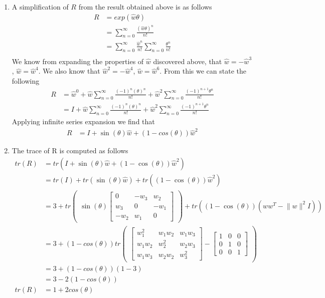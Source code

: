 \documentclass[10pt]{article}
\def\0{\boldsymbol{0}}
\def\w{\boldsymbol{w}}
\begin{document}
\begin{enumerate}
\begin{enumerate}
\item A simplification of $R$ from the result obtained above is as follows
\begin {align*} R &= exp(\hat{w} \theta) \\
&= \sum_{n=0}^{\infty} \frac{(\hat{w}\theta)^n}{n!} \\
&= \sum_{n=0}^{\infty} \frac{\hat{w}^n}{n!} \sum_{n=0}^{\infty} \frac{\theta^n}{n!} \\
\end{align*}
We know from expanding the properties of $\hat{w}$ discovered above, that $\hat{w} = - \hat{w}^3$, $\hat{w} = \hat{w}^4$. We also know that $\hat{w}^2 = - \hat{w}^4$, $\hat{w} = \hat{w}^6$. From this we can state the following
\begin{align*} R &= \hat{w}^0 + \hat{w} \sum_{n=0}^{\infty} \frac{(-1)^{n}(\theta)^n}{n!} + \hat{w}^2 \sum_{n=0}^{\infty} \frac{(-1)^{n+1}\theta^n}{n!} \\
&= I+ \hat{w} \sum_{n=0}^{\infty} \frac{(-1)^{n}(\theta)^n}{n!} + \hat{w}^2 \sum_{n=0}^{\infty} \frac{(-1)^{n+1}\theta^n}{n!}
\end{align*}
Applying infinite series expansion we find that
\begin{align*}
R &= I + \sin(\theta)\hat{w} + (1-cos(\theta))\hat{w}^2
\end{align*}
\item The trace of R is computed as follows
\begin{align*} tr(R) &= tr(I + \sin(\theta) \hat{w} + (1 - \cos(\theta))\hat{w}^2) \\
&= tr(I) + tr(\sin(\theta) \hat{w}) + tr((1 - \cos(\theta))\hat{w}^2)\\
&= 3 + tr \begin{pmatrix} \sin(\theta) \begin{bmatrix}0&-w_3&w_2\\w_3&0&-w_1\\-w_2&w_1&0\end{bmatrix} \end{pmatrix} + tr((1-\cos(\theta))(ww^T - \lVert w \rVert^2I)) \\
&= 3 + (1 - cos(\theta)) tr \begin{pmatrix} \begin{bmatrix}w_1^2 & w_1w_2 & w_1w_3 \\ w_1w_2 & w_2^2 & w_2w_3 \\ w_1w_3 & w_2w_2 & w_3^2 \end{bmatrix} - \begin{bmatrix}1&0&0\\0&1&0\\0&0&1 \end{bmatrix} \end{pmatrix} \\
&= 3 + (1 - cos(\theta)) (1 - 3)\\
&= 3 - 2(1 - cos(\theta)) \\
tr(R) &= 1 + 2 cos(\theta)
\end{align*}


\end{enumerate}
\end{enumerate}
\end{document}

